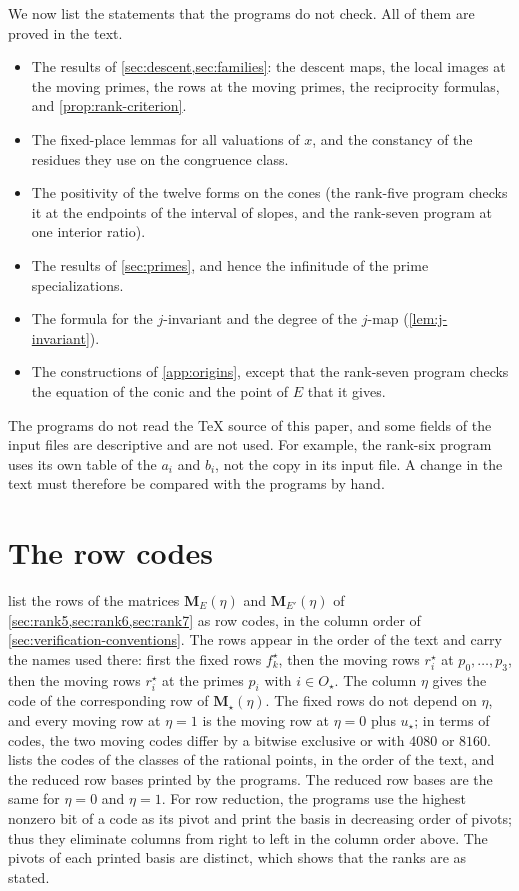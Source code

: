 \documentclass[12pt,oneside,openany]{book}
\theoremstyle{definition}
\theoremstyle{plain}
\numberwithin{equation}{chapter}
\theoremstyle{plain}
\theoremstyle{definition}
\theoremstyle{remark}
\begin{document}
We now list the statements that the programs do not check. All of them are proved in the text.
\begin{itemize}
\item The results of \cref{sec:descent,sec:families}: the descent maps, the local images at the moving primes, the rows at the moving primes, the reciprocity formulas, and \cref{prop:rank-criterion}.
\item The fixed-place lemmas for all valuations of $x$, and the constancy of the residues they use on the congruence class.
\item The positivity of the twelve forms on the cones (the rank-five program checks it at the endpoints of the interval of slopes, and the rank-seven program at one interior ratio).
\item The results of \cref{sec:primes}, and hence the infinitude of the prime specializations.
\item The formula for the $j$-invariant and the degree of the $j$-map (\cref{lem:j-invariant}).
\item The constructions of \cref{app:origins}, except that the rank-seven program checks the equation of the conic and the point of $E$ that it gives.
\end{itemize}
The programs do not read the \TeX{} source of this paper, and some fields of the input files are descriptive and are not used. For example, the rank-six program uses its own table of the $a_i$ and $b_i$, not the copy in its input file. A change in the text must therefore be compared with the programs by hand.

\section{The row codes}\label{sec:verification-codes}

 list the rows of the matrices $\mathbf M_E(\eta)$ and $\mathbf M_{E'}(\eta)$ of \cref{sec:rank5,sec:rank6,sec:rank7} as row codes, in the column order of \cref{sec:verification-conventions}. The rows appear in the order of the text and carry the names used there: first the fixed rows $f^\star_k$, then the moving rows $r^\star_i$ at $p_0,\dots,p_3$, then the moving rows $r^\star_i$ at the primes $p_i$ with $i\in O_\star$. The column $\eta$ gives the code of the corresponding row of $\mathbf M_\star(\eta)$. The fixed rows do not depend on $\eta$, and every moving row at $\eta=1$ is the moving row at $\eta=0$ plus $u_\star$; in terms of codes, the two moving codes differ by a bitwise exclusive or with $4080$ or $8160$.  lists the codes of the classes of the rational points, in the order of the text, and the reduced row bases printed by the programs. The reduced row bases are the same for $\eta=0$ and $\eta=1$. For row reduction, the programs use the highest nonzero bit of a code as its pivot and print the basis in decreasing order of pivots; thus they eliminate columns from right to left in the column order above. The pivots of each printed basis are distinct, which shows that the ranks are as stated.
\end{document}
